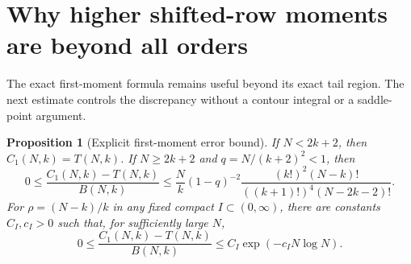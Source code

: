 \documentclass[11pt,letterpaper]{article}
\numberwithin{equation}{section}
\newtheorem{proposition}[theorem]{Proposition}
\theoremstyle{definition}
\begin{document}
\section{Why higher shifted-row moments are beyond all orders}
\label{lis:sec:firsterror}
The exact first-moment formula remains useful beyond its exact tail
region. The next estimate controls the discrepancy without a contour
integral or a saddle-point argument.

\begin{proposition}[Explicit first-moment error bound]\label{lis:prop:errorbound}
If $N<2k+2$, then $C_1(N,k)=T(N,k)$.
If $N\ge2k+2$ and $q=N/(k+2)^2<1$, then
\begin{equation}
 0\le\frac{C_1(N,k)-T(N,k)}{B(N,k)}
 \le \frac{N}{k}(1-q)^{-2}
       \frac{(k!)^2(N-k)!}{((k+1)!)^4(N-2k-2)!}.
 \label{lis:eq:errorbound}
\end{equation}
For $\rho=(N-k)/k$ in any fixed compact $I\subset(0,\infty)$,
there are constants $C_I,c_I>0$ such that, for sufficiently large $N$,
\begin{equation}
 0\le\frac{C_1(N,k)-T(N,k)}{B(N,k)}
 \le C_I\exp(-c_I N\log N).
 \label{lis:eq:superalgebraic}
\end{equation}
\end{proposition}
\end{document}
